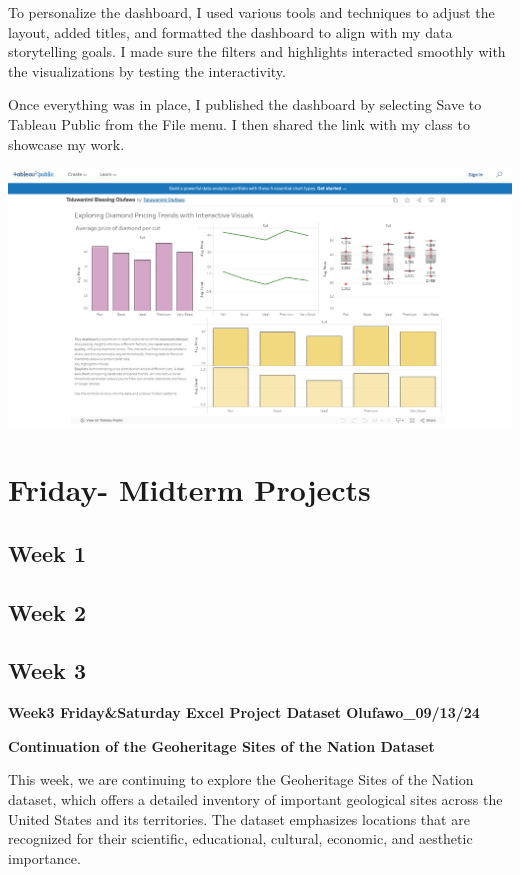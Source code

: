 \documentclass[
  letterpaper,
  DIV=11,
  numbers=noendperiod]{scrreprt}
\begin{document}
To personalize the dashboard, I used various tools and techniques to
adjust the layout, added titles, and formatted the dashboard to align
with my data storytelling goals. I made sure the filters and highlights
interacted smoothly with the visualizations by testing the
interactivity.

Once everything was in place, I published the dashboard by selecting
Save to Tableau Public from the File menu. I then shared the link with
my class to showcase my work.

\includegraphics{Dashboard_Olufawo.png}

\section{Friday- Midterm Projects}\label{friday--midterm-projects}

\subsection{Week 1}\label{week-1-8}

\subsection{Week 2}\label{week-2-8}

\subsection{Week 3}\label{week-3-6}

\textbf{Week3 Friday\&Saturday Excel Project Dataset Olufawo\_09/13/24}

\textbf{Continuation of the Geoheritage Sites of the Nation Dataset}

This week, we are continuing to explore the Geoheritage Sites of the
Nation dataset, which offers a detailed inventory of important
geological sites across the United States and its territories. The
dataset emphasizes locations that are recognized for their scientific,
educational, cultural, economic, and aesthetic importance.
\end{document}
